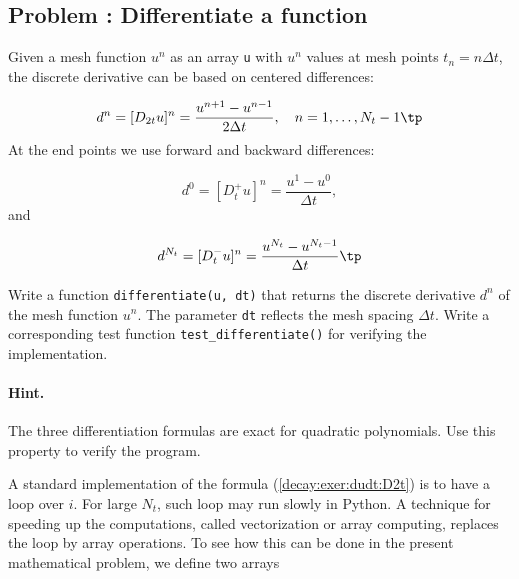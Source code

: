 \documentclass[graybox,sectrefs,envcountresetchap,open=right,final]{svmonodo}
\newenvironment{doconceexercise}{}{}
\newcounter{doconceexercisecounter}
\begin{document}
\begin{doconceexercise}

\subsection*{Problem \thedoconceexercisecounter: Differentiate a function}

\label{decay:exer:dudt}

  

Given a mesh function $u^n$ as an array \texttt{u} with $u^n$ values at mesh
points $t_n=n\Delta t$, the discrete derivative can be based on
centered differences:

\begin{equation}
d^n = [D_{2t}u]^n =
\frac{u^{n+1}-u^{n-1}}{2\Delta t},\quad n=1,\ldots,N_t-1\tp
\label{decay:exer:dudt:D2t}
\end{equation}
At the end points we use forward and backward differences:

\[ d^0 = [D_t^+u]^n = \frac{u^{1}-u^{0}}{\Delta t},\]
and

\[ d^{N_t} = [D_t^-u]^n = \frac{u^{N_t}-u^{N_t-1}}{\Delta t}\tp\]


Write a function
\texttt{differentiate(u, dt)} that returns the discrete derivative $d^n$ of the
mesh function $u^n$. The parameter \texttt{dt} reflects the
mesh spacing $\Delta t$. Write a corresponding test function
\Verb!test_differentiate()! for verifying the implementation.


\paragraph{Hint.}
The three differentiation formulas are
exact for quadratic polynomials. Use this property to verify the program.




A standard implementation of the formula (\ref{decay:exer:dudt:D2t}) is to
have a loop over $i$. For large $N_t$, such loop may run slowly in
Python. A technique for speeding up the computations, called vectorization
or array computing,
replaces the loop by array operations. To see how this can be done in
the present mathematical problem, we
define two arrays


\end{doconceexercise}
\end{document}
